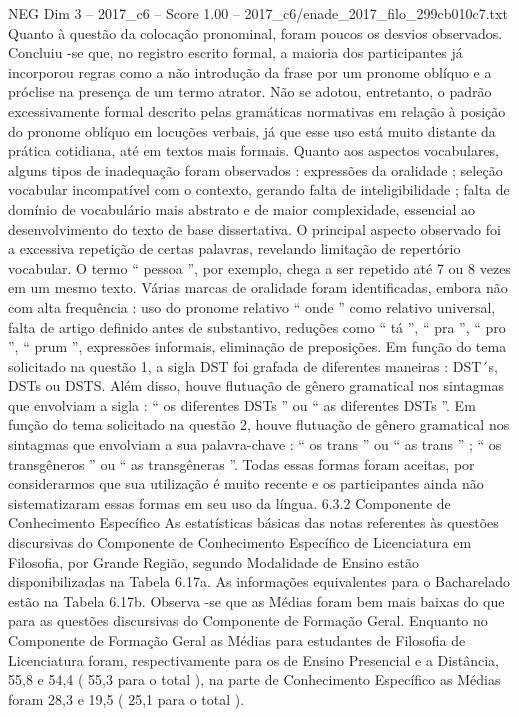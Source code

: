\begin{textsample}{NEG Dim 3 – 2017\_c6 – Score 1.00 – 2017\_c6/enade\_2017\_filo\_299cb010c7.txt}
Quanto à questão da colocação pronominal, foram poucos os desvios observados.
Concluiu -se que, no registro escrito formal, a maioria dos participantes já incorporou regras como a não introdução da frase por um pronome oblíquo e a próclise na presença de um termo atrator.
Não se adotou, entretanto, o padrão excessivamente formal descrito pelas gramáticas normativas em relação à posição do pronome oblíquo em locuções verbais, já que esse uso está muito distante da prática cotidiana, até em textos mais formais.
Quanto aos aspectos vocabulares, alguns tipos de inadequação foram observados : expressões da oralidade ; seleção vocabular incompatível com o contexto, gerando falta de inteligibilidade ; falta de domínio de vocabulário mais abstrato e de maior complexidade, essencial ao desenvolvimento do texto de base dissertativa.
O principal aspecto observado foi a excessiva repetição de certas palavras, revelando limitação de repertório vocabular.
O termo “ pessoa ”, por exemplo, chega a ser repetido até 7 ou 8 vezes em um mesmo texto.
Várias marcas de oralidade foram identificadas, embora não com alta frequência : uso do pronome relativo “ onde ” como relativo universal, falta de artigo definido antes de substantivo, reduções como “ tá ”, “ pra ”, “ pro ”, “ prum ”, expressões informais, eliminação de preposições.
Em função do tema solicitado na questão 1, a sigla DST foi grafada de diferentes maneiras : DST´s, DSTs ou DSTS.
Além disso, houve flutuação de gênero gramatical nos sintagmas que envolviam a sigla : “ os diferentes DSTs ” ou “ as diferentes DSTs ”.
Em função do tema solicitado na questão 2, houve flutuação de gênero gramatical nos sintagmas que envolviam a sua palavra-chave : “ os trans ” ou “ as trans ” ; “ os transgêneros ” ou “ as transgêneras ”.
Todas essas formas foram aceitas, por considerarmos que sua utilização é muito recente e os participantes ainda não sistematizaram essas formas em seu uso da língua. 6.3.2 Componente de Conhecimento Específico As estatísticas básicas das notas referentes às questões discursivas do Componente de Conhecimento Específico de Licenciatura em Filosofia, por Grande Região, segundo Modalidade de Ensino estão disponibilizadas na Tabela 6.17a.
As informações equivalentes para o Bacharelado estão na Tabela 6.17b.
Observa -se que as Médias foram bem mais baixas do que para as questões discursivas do Componente de Formação Geral.
Enquanto no Componente de Formação Geral as Médias para estudantes de Filosofia de Licenciatura foram, respectivamente para os de Ensino Presencial e a Distância, 55,8 e 54,4 ( 55,3 para o total ), na parte de Conhecimento Específico as Médias foram 28,3 e 19,5 ( 25,1 para o total ).

\end{textsample}
